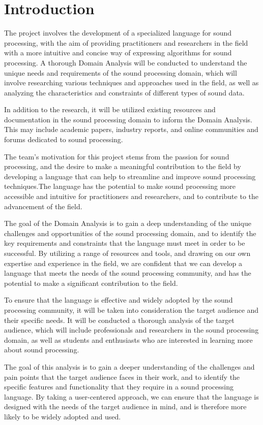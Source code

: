 \chapter*{Introduction}
The project involves the development of a specialized language for sound processing, with the aim of providing practitioners and researchers in the field with a more intuitive and concise way of expressing algorithms for sound processing. A thorough Domain Analysis will be conducted to understand the unique needs and requirements of the sound processing domain, which will involve researching various techniques and approaches used in the field, as well as analyzing the characteristics and constraints of different types of sound data. 

In addition to the research, it will be utilized existing resources and documentation in the sound processing domain to inform the Domain Analysis. This may include academic papers, industry reports, and online communities and forums dedicated to sound processing.

The team's motivation for this project stems from the passion for sound processing, and the desire to make a meaningful contribution to the field by developing a language that can help to streamline and improve sound processing techniques.The language has the potential to make sound processing more accessible and intuitive for practitioners and researchers, and to contribute to the advancement of the field.

The goal of the Domain Analysis is to gain a deep understanding of the unique challenges and opportunities of the sound processing domain, and to identify the key requirements and constraints that the language must meet in order to be successful. By utilizing a range of resources and tools, and drawing on our own expertise and experience in the field, we are confident that we can develop a language that meets the needs of the sound processing community, and has the potential to make a significant contribution to the field.

To ensure that the language is effective and widely adopted by the sound processing community, it will be taken into consideration the target audience and their specific needs. It will be conducted a thorough analysis of the target audience, which will include professionals and researchers in the sound processing domain, as well as students and enthusiasts who are interested in learning more about sound processing.

The goal of this analysis is to gain a deeper understanding of the challenges and pain points that the target audience faces in their work, and to identify the specific features and functionality that they require in a sound processing language. By taking a user-centered approach, we can ensure that the language is designed with the needs of the target audience in mind, and is therefore more likely to be widely adopted and used.

